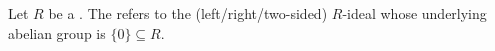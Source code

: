 \begin{definition} \label{definition:zero_ideal_of_a_ring}
    Let $R$ be a . 
    The  refers to the (left/right/two-sided) $R$-ideal whose underlying abelian group is $\{0\} \subseteq R$.
\end{definition}